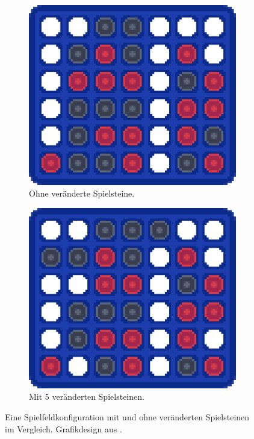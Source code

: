 \begin{figure}[ht!]%
	\begin{subfigure}[b]{0.48\textwidth}
		\includegraphics[width=\textwidth]{Bilder/connect-four-boards/without-observation-manipulations.png}
		\caption{Ohne veränderte Spielsteine.}
		\label{fig:f25}
	\end{subfigure}
	\hfill
	\begin{subfigure}[b]{0.48\textwidth}
		\includegraphics[width=\textwidth]{Bilder/connect-four-boards/with-observation-manipulations}
		\caption{Mit 5 veränderten Spielsteinen.}
		\label{fig:f26}
	\end{subfigure}
	\caption[Eine Spielfeldkonfiguration mit und ohne veränderten Spielsteinen im Vergleich.]{Eine Spielfeldkonfiguration mit und ohne veränderten Spielsteinen im Vergleich. Grafikdesign aus \cite{Farama.2025}.}
	\label{fig:f25andf26}
\end{figure}

